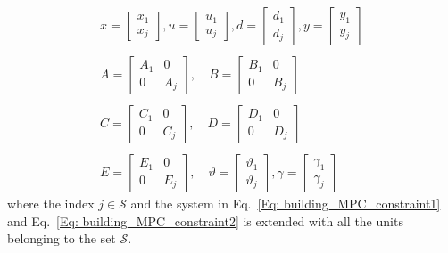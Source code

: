 %
{ \begin{equation}
\begin{array}{l}
x = \left[ {\begin{array}{*{20}{c}}
{{x_1}}\\
{{x_j}}
\end{array}} \right],u = \left[ {\begin{array}{*{20}{c}}
{{u_1}}\\
{{u_j}}
\end{array}} \right],d = \left[ {\begin{array}{*{20}{c}}
{{d_1}}\\
{{d_j}}
\end{array}} \right],y = \left[ {\begin{array}{*{20}{c}}
{{y_1}}\\
{{y_j}}
\end{array}} \right]\\
\\
A = \left[ {\begin{array}{*{20}{c}}
{{A_1}}&0\\
0&{{A_j}}
\end{array}} \right],\quad B = \left[ {\begin{array}{*{20}{c}}
{{B_1}}&0\\
0&{{B_j}}
\end{array}} \right]\\
\\
C = \left[ {\begin{array}{*{20}{c}}
{{C_1}}&0\\
0&{{C_j}}
\end{array}} \right],\quad D = \left[ {\begin{array}{*{20}{c}}
{{D_1}}&0\\
0&{{D_j}}
\end{array}} \right]\\
\\
E = \left[ {\begin{array}{*{20}{c}}
{{E_1}}&0\\
0&{{E_j}}
\end{array}} \right],\quad \vartheta  = \left[ {\begin{array}{*{20}{c}}
{{\vartheta _1}}\\
{{\vartheta _j}}
\end{array}} \right],\gamma  = \left[ {\begin{array}{*{20}{c}}
{{\gamma _1}}\\
{{\gamma _j}}
\end{array}} \right]
\end{array}
\end{equation}}
where the index $j \in \mathcal{S}$ and the system in Eq.~\eqref{Eq: building_MPC_constraint1} and Eq.~\eqref{Eq: building_MPC_constraint2} is extended with all the units belonging to the set $\mathcal{S}$.
